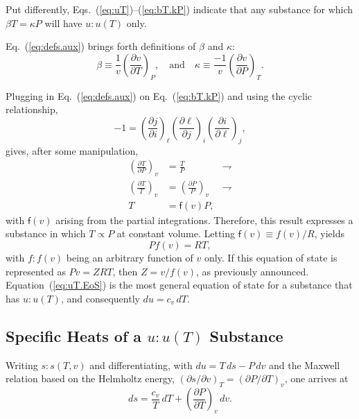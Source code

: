 \documentclass[fleqn,11pt]{SelfArx}
\newcommand{\parxyz}[3]{\left(\frac{\partial {{#1}}}{\partial {{#2}}}\right)_{\!\!\!{#3}}}
\newcommand{\inlxyz}[3]{({\partial {{#1}}}/{\partial {{#2}}})_{{#3}}}
\begin{document}
    Put differently, Eqs.~(\ref{eq:uT})--(\ref{eq:bT.kP}) indicate that any substance for  which
    $\beta T = \kappa P$ will have $u\!:\!u(T)$ only.

    Eq.~(\ref{eq:defs.aux}) brings forth definitions of $\beta$ and $\kappa$:
    \begin{equation}
        \beta  \equiv \frac{1}{v}\parxyz vTP, \quad\mbox{and}\quad
        \kappa \equiv \frac{-1}{v}\parxyz vPT.
        \label{eq:defs.aux}
    \end{equation}

    Plugging  in  Eq.~(\ref{eq:defs.aux})  on  Eq.~(\ref{eq:bT.kP})   and   using   the   cyclic
    relationship,
    \begin{equation}
        -1 = \parxyz ji\ell \parxyz\ell ji \parxyz i\ell j,
        \label{eq:cyclic}
    \end{equation}
    \noindent gives, after some manipulation,
    \begin{align}
        \parxyz TPv & = \frac{T}{P} & \rightharpoondown \\
        \left(\frac{\partial T}{T}\right)_{\!\!\!v} & =
            \left(\frac{\partial P}{P}\right)_{\!\!\!v} & \rightharpoondown \\
        T & = \mathsf{f}(v)P,
        \label{eq:uT.TPv}
    \end{align}
    \noindent with $\mathsf{f}(v)$ arising from the partial integrations. Therefore, this result
    expresses a substance in which $T \propto P$  at  constant  volume.  Letting  $\mathsf{f}(v)
    \equiv f(v)/R$, yields
    \begin{equation}
        Pf(v) = RT,
        \label{eq:uT.EoS}
    \end{equation}
    \noindent with $f\!:\!f(v)$ being an arbitrary function of $v$ only.  If  this  equation  of
    state  is  represented  as  $Pv  =  ZRT$,  then  $Z  =  v/f(v)$,  as  previously  announced.
    Equation~(\ref{eq:uT.EoS}) is the most general equation of state for a  substance  that  has
    $u\!:\!u(T)$, and consequently $du = c_v\,dT$.

    \subsection{Specific Heats of a $u\!:\!u(T)$ Substance}

    Writing $s\!:\!s(T, v)$ and differentiating, with $du =  T\,ds  -  P\,dv$  and  the  Maxwell
    relation based on the Helmholtz energy, $\inlxyz svT = \inlxyz PTv$, one arrives at
    \begin{equation}
        ds = \frac{c_v}{T}\,dT + \parxyz PTv\,dv.
        \label{eq:ds.Tv}
    \end{equation}
\end{document}
